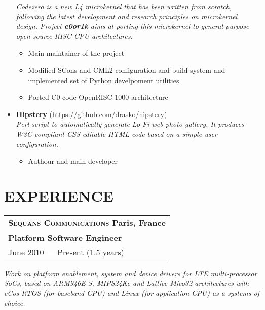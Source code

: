 \documentclass[a4paper, oneside, final]{scrartcl}
\begin{document}
\begin{itemize}
         \textit{Codezero is a new L4 microkernel that has been written from scratch,
            following the latest development and research principles on
               microkernel design. Project \textbf{c0or1k} aims at porting this
               microkernel to general purpose open source RISC CPU
               architectures.}
      \begin{itemize}
         \item Main maintainer of the project 
         \item Modified SCons and CML2 configuration and build system and implemented set of
               Python develpoment utilities
         \item Ported C0 code OpenRISC 1000 architecture
   \end{itemize}
   \item \textbf{Hipstery} (\url{https://github.com/drasko/hipstery}) \\
      \textit{Perl script to automatically generate Lo-Fi web photo-gallery. It
         produces W3C compliant CSS editable HTML code based on a simple user configuration.} 
      \begin{itemize}
         \item Authour and main developer 
   \end{itemize}
\end{itemize}


\section{EXPERIENCE}

\newcommand{\gray}{\rowcolor[gray]{.90}}
   \begin{tabularx}{1.0\linewidth}{X}
      \gray \bf\textsc{\large{Sequans Communications}} \normalfont\hfill Paris, France\\
      \gray \bf{Platform Software Engineer}\\
      \gray June 2010 --- Present (1.5 years) \\
   \end{tabularx}

\medskip

   \textit{Work on platform enablement, system and device drivers for LTE
   multi-processor SoCs, based on ARM946E-S, MIPS24Kc and Lattice Mico32
   architectures with eCos RTOS (for baseband CPU) and Linux (for application CPU)
   as a systems of choice.}
\end{document}
